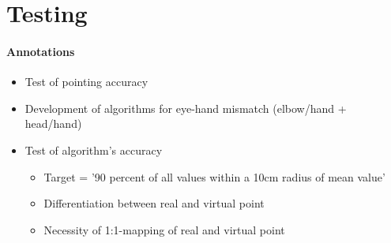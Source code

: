 \section{Testing}
\label{conception_testing}

\paragraph{Annotations}

\begin{itemize}
	\item Test of pointing accuracy
	\\
	\item Development of algorithms for eye-hand mismatch (elbow/hand + head/hand)
	\\
	\item Test of algorithm's accuracy
	\begin{itemize}
		\item Target = '90 percent of all values within a 10cm radius of mean value'
		\item Differentiation between real and virtual point
		\item Necessity of 1:1-mapping of real and virtual point
	\end{itemize}
\end{itemize}
